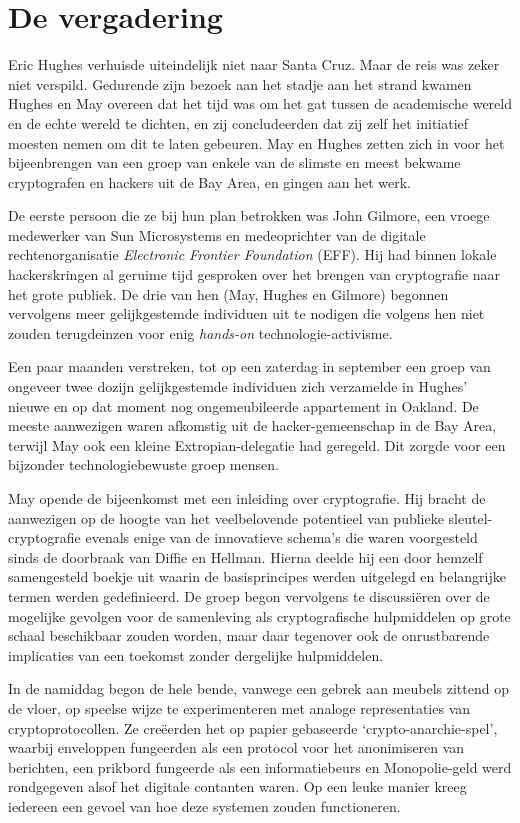 \documentclass[smalldemyvopaper,11pt,twoside,onecolumn,openright,extrafontsizes,hidelinks]{memoir}
\begin{document}
\section{De vergadering}\label{de-vergadering}

Eric Hughes verhuisde uiteindelijk niet naar Santa Cruz. Maar de reis
was zeker niet verspild. Gedurende zijn bezoek aan het stadje aan het
strand kwamen Hughes en May overeen dat het tijd was om het gat tussen
de academische wereld en de echte wereld te dichten, en zij
concludeerden dat zij zelf het initiatief moesten nemen om dit te laten
gebeuren. May en Hughes zetten zich in voor het bijeenbrengen van een
groep van enkele van de slimste en meest bekwame cryptografen en hackers
uit de Bay Area, en gingen aan het werk.

De eerste persoon die ze bij hun plan betrokken was John Gilmore, een
vroege medewerker van Sun Microsystems en medeoprichter van de digitale
rechtenorganisatie \emph{Electronic Frontier Foundation} (EFF). Hij had
binnen lokale hackerskringen al geruime tijd gesproken over het brengen
van cryptografie naar het grote publiek. De drie van hen (May, Hughes en
Gilmore) begonnen vervolgens meer gelijkgestemde individuen uit te
nodigen die volgens hen niet zouden terugdeinzen voor enig
\emph{hands-on} technologie-activisme.

Een paar maanden verstreken, tot op een zaterdag in september een groep
van ongeveer twee dozijn gelijkgestemde individuen zich verzamelde in
Hughes' nieuwe en op dat moment nog ongemeubileerde appartement in
Oakland. De meeste aanwezigen waren afkomstig uit de hacker-gemeenschap
in de Bay Area, terwijl May ook een kleine Extropian-delegatie had
geregeld. Dit zorgde voor een bijzonder technologiebewuste groep mensen.

May opende de bijeenkomst met een inleiding over cryptografie. Hij
bracht de aanwezigen op de hoogte van het veelbelovende potentieel van
publieke sleutel-cryptografie evenals enige van de innovatieve schema's
die waren voorgesteld sinds de doorbraak van Diffie en Hellman. Hierna
deelde hij een door hemzelf samengesteld boekje uit waarin de
basisprincipes werden uitgelegd en belangrijke termen werden
gedefinieerd. De groep begon vervolgens te discussiëren over de
mogelijke gevolgen voor de samenleving als cryptografische hulpmiddelen
op grote schaal beschikbaar zouden worden, maar daar tegenover ook de
onrustbarende implicaties van een toekomst zonder dergelijke
hulpmiddelen.

In de namiddag begon de hele bende, vanwege een gebrek aan meubels
zittend op de vloer, op speelse wijze te experimenteren met analoge
representaties van cryptoprotocollen. Ze creëerden het op papier
gebaseerde `crypto-anarchie-spel', waarbij enveloppen fungeerden als een
protocol voor het anonimiseren van berichten, een prikbord fungeerde als
een informatiebeurs en Monopolie-geld werd rondgegeven alsof het
digitale contanten waren. Op een leuke manier kreeg iedereen een gevoel
van hoe deze systemen zouden functioneren.
\end{document}
